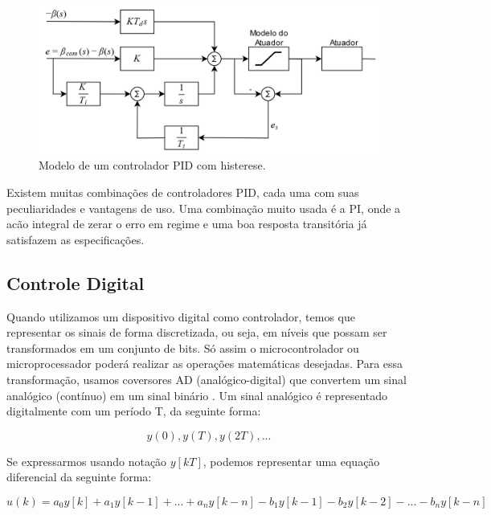 \begin{figure}[H]
  \caption{Modelo de um controlador PID com histerese.}
  \begin{center}
      \includegraphics[scale=0.55]{referencial/img/pid_antiwindup_astrom_p83}
  \end{center}
  \label{fig:pid_antiwindup_astrom_p83}
\end{figure}

Existem muitas combinações de controladores PID, cada uma com suas peculiaridades e vantagens de uso. Uma combinação muito usada é a PI, onde a acão integral de zerar o erro em regime e uma boa resposta transitória já satisfazem as especificações. 



\subsection{Controle Digital}

Quando utilizamos um dispositivo digital como controlador, temos que representar os sinais de forma discretizada, ou seja, em níveis que possam ser transformados em um conjunto de bits. Só assim o microcontrolador ou microprocessador poderá realizar as operações matemáticas desejadas. Para essa transformação, usamos coversores AD (analógico-digital) que convertem um sinal analógico (contínuo) em um sinal binário \cite{BongWie2001}. Um sinal analógico é representado digitalmente com um período T, da seguinte forma:

\begin{equation}
  y(0), y(T), y(2T), ...
\end{equation}

Se expressarmos usando notação ${y[kT]}$, podemos representar uma equação diferencial da seguinte forma:

\begin{equation}
  u(k) = a_{0}y[k]+a_{1}y[k-1]+...+a_{n}y[k-n] - b_{1}y[k-1] - b_{2}y[k-2] - ... -b_{n}y[k-n]
\end{equation}

